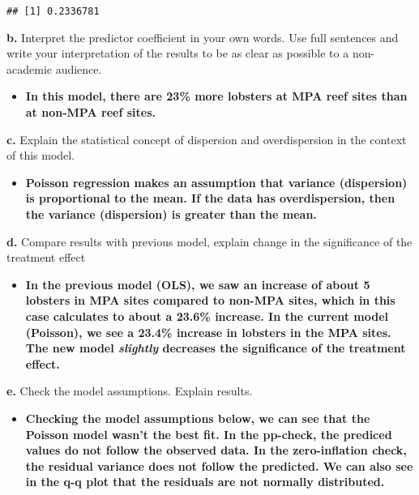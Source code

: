 \documentclass[
]{article}
\newenvironment{Shaded}{\begin{snugshade}}{\end{snugshade}}
\newcommand{\CommentTok}[1]{\textcolor[rgb]{0.56,0.35,0.01}{\textit{#1}}}
\newcommand{\DecValTok}[1]{\textcolor[rgb]{0.00,0.00,0.81}{#1}}
\newcommand{\FloatTok}[1]{\textcolor[rgb]{0.00,0.00,0.81}{#1}}
\newcommand{\FunctionTok}[1]{\textcolor[rgb]{0.13,0.29,0.53}{\textbf{#1}}}
\newcommand{\NormalTok}[1]{#1}
\newcommand{\SpecialCharTok}[1]{\textcolor[rgb]{0.81,0.36,0.00}{\textbf{#1}}}
\providecommand{\tightlist}{%
  \setlength{\itemsep}{0pt}\setlength{\parskip}{0pt}}
\begin{document}
\begin{Shaded}
\end{Shaded}

\begin{verbatim}
## [1] 0.2336781
\end{verbatim}

\textbf{b.} Interpret the predictor coefficient in your own words. Use
full sentences and write your interpretation of the results to be as
clear as possible to a non-academic audience.

\begin{itemize}
\tightlist
\item
  \textbf{In this model, there are 23\% more lobsters at MPA reef sites
  than at non-MPA reef sites.}
\end{itemize}

\textbf{c.} Explain the statistical concept of dispersion and
overdispersion in the context of this model.

\begin{itemize}
\tightlist
\item
  \textbf{Poisson regression makes an assumption that variance
  (dispersion) is proportional to the mean. If the data has
  overdispersion, then the variance (dispersion) is greater than the
  mean.}
\end{itemize}

\textbf{d.} Compare results with previous model, explain change in the
significance of the treatment effect

\begin{itemize}
\tightlist
\item
  \textbf{In the previous model (OLS), we saw an increase of about 5
  lobsters in MPA sites compared to non-MPA sites, which in this case
  calculates to about a 23.6\% increase. In the current model (Poisson),
  we see a 23.4\% increase in lobsters in the MPA sites. The new model
  \emph{slightly} decreases the significance of the treatment effect.}
\end{itemize}

\textbf{e.} Check the model assumptions. Explain results.

\begin{itemize}
\tightlist
\item
  \textbf{Checking the model assumptions below, we can see that the
  Poisson model wasn't the best fit. In the pp-check, the prediced
  values do not follow the observed data. In the zero-inflation check,
  the residual variance does not follow the predicted. We can also see
  in the q-q plot that the residuals are not normally distributed.}
\end{itemize}
\end{document}
